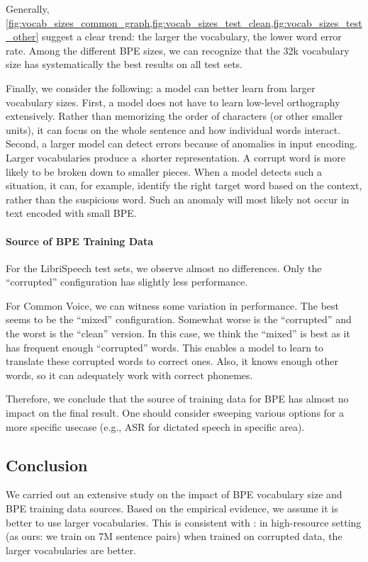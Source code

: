 Generally, \cref{fig:vocab_sizes_common_graph,fig:vocab_sizes_test_clean,fig:vocab_sizes_test_other} suggest a clear trend: the larger the vocabulary, the lower word error rate. Among the different BPE sizes, we can recognize that the 32k vocabulary size has systematically the best results on all test sets.

Finally, we consider the following: a model can better learn from larger vocabulary sizes. First, a model does not have to learn low-level orthography extensively. Rather than memorizing the order of characters (or other smaller units), it can focus on the whole sentence and how individual words interact. Second, a larger model can detect errors because of anomalies in input encoding. Larger vocabularies produce a~shorter representation. A corrupt word is more likely to be broken down to smaller pieces. When a model detects such a situation, it can, for example, identify the right target word based on the context, rather than the suspicious word. Such an anomaly will most likely not occur in text encoded with small BPE.

\paragraph{Source of BPE Training Data}
For the LibriSpeech test sets, we observe almost no differences. Only the ``corrupted'' configuration has slightly less performance. 

For Common Voice, we can witness some variation in performance. The best seems to be the ``mixed'' configuration. Somewhat worse is the ``corrupted'' and the worst is the ``clean'' version. In this case, we think the ``mixed'' is best as it has frequent enough ``corrupted'' words. This enables a model to learn to translate these corrupted words to correct ones. Also, it knows enough other words, so it can adequately work with correct phonemes.

Therefore, we conclude that the source of training data for BPE has almost no impact on the final result. One should consider sweeping various options for a more specific usecase (e.g., ASR for dictated speech in specific area).

\subsection{Conclusion}
\label{easr:tok_conclusion}
We carried out an extensive study on the impact of BPE vocabulary size and BPE training data sources. Based on the empirical evidence, we assume it is better to use larger vocabularies. This is consistent with : in high-resource setting (as ours: we train on 7M sentence pairs) when trained on corrupted data, the larger vocabularies are better. 

